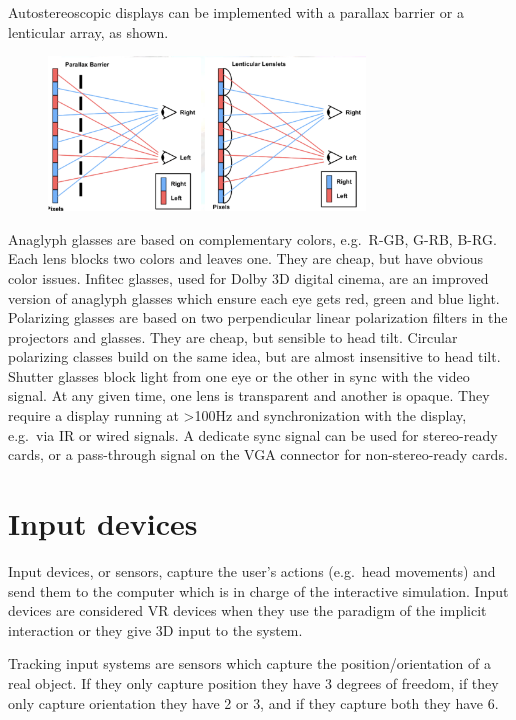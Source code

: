 \documentclass[a4paper]{article}
\begin{document}
Autostereoscopic displays can be implemented with a parallax barrier or
a lenticular array, as shown.

\begin{figure}
\centering
\includegraphics[width=0.75\textwidth]{autostereoscopic-impl}
\end{figure}

Anaglyph glasses are based on complementary colors, e.g.~R-GB, G-RB,
B-RG. Each lens blocks two colors and leaves one. They are cheap, but
have obvious color issues. Infitec glasses, used for Dolby 3D digital
cinema, are an improved version of anaglyph glasses which ensure each
eye gets red, green and blue light. Polarizing glasses are based on two
perpendicular linear polarization filters in the projectors and glasses.
They are cheap, but sensible to head tilt. Circular polarizing classes
build on the same idea, but are almost insensitive to head tilt. Shutter
glasses block light from one eye or the other in sync with the video
signal. At any given time, one lens is transparent and another is
opaque. They require a display running at \textgreater100Hz and
synchronization with the display, e.g.~via IR or wired signals. A
dedicate sync signal can be used for stereo-ready cards, or a
pass-through signal on the VGA connector for non-stereo-ready cards.


\section{Input devices}

Input devices, or sensors, capture the user's actions (e.g.~head
movements) and send them to the computer which is in charge of the
interactive simulation. Input devices are considered VR devices when
they use the paradigm of the implicit interaction or they give 3D input
to the system.

Tracking input systems are sensors which capture the
position/orientation of a real object. If they only capture position
they have 3 degrees of freedom, if they only capture orientation they
have 2 or 3, and if they capture both they have 6.
\end{document}
